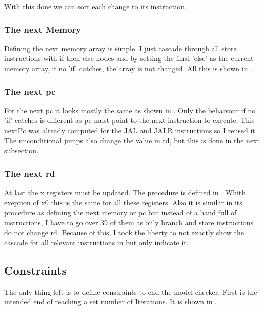 With this done we can sort each change to its instruction.



\subsubsection{The next Memory}
Defining the next memory array is simple. I just cascade through all store
instructions with if-then-else nodes and by setting the final 'else' as the
current memory array, if no 'if' catches, the array is not changed. All this is
shown in .



\subsubsection{The next pc}
For the next pc it looks mostly the same as shown in . Only
the behaivour if no 'if' catches is different as pc must point to the next
instruction to execute. This nextPc was already computed for the JAL and JALR
instructions so I reused it. The unconditional jumps also change the value in
rd, but this is done in the next subsection.



\subsubsection{The next rd}
At last the x registers must be updated. The procedure is defined in
. Whith exeption of x0 this is the same for all these
registers. Also it is similar in its procedure as defining the next memory or
pc but instead of a hand full of instructions, I have to go over 39 of them as
only branch and store instructions do not change rd. Because of this, I took
the liberty to not exactly show the cascade for all relevant instructions in
 but only indicate it.



\subsection{Constraints}
The only thing left is to define constraints to end the model checker. First is
the intended end of reaching a set number of Iterations. It is shown in
.

